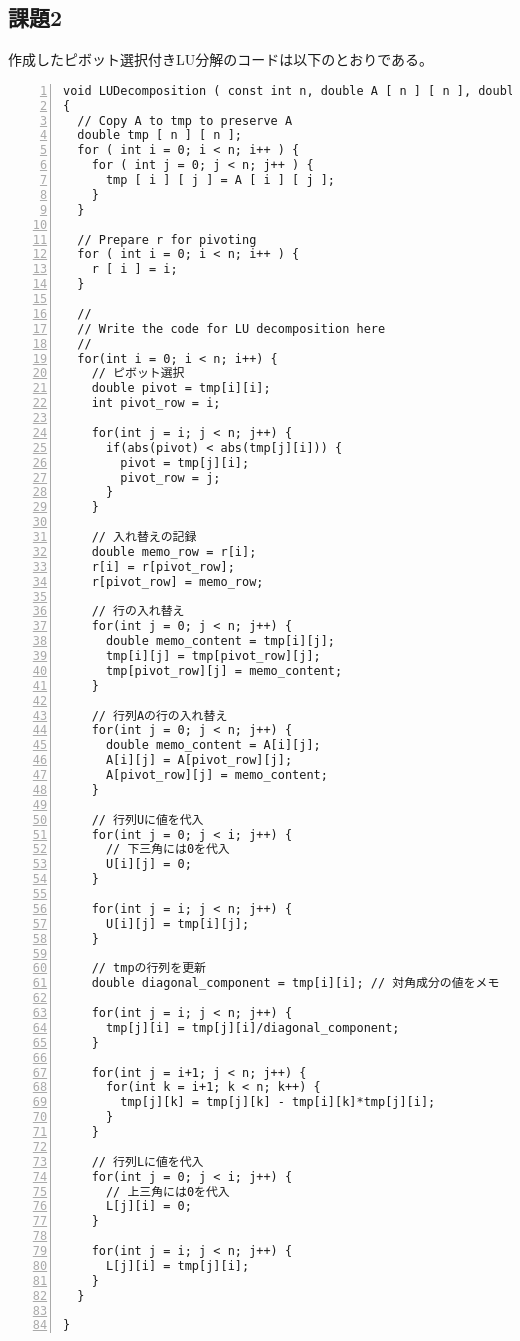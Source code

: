 \documentclass[a4paper]{jsarticle}
\begin{document}
\subsection*{課題2}

作成したピボット選択付きLU分解のコードは以下のとおりである。

\begin{lstlisting}[caption={\texttt{ピボット選択付きLU分解のプログラム}}, numbers=left, label={pivot_LU}]
  void LUDecomposition ( const int n, double A [ n ] [ n ], double L [ n ] [ n ], double U [ n ] [ n ], double r [ n ] )
{
  // Copy A to tmp to preserve A
  double tmp [ n ] [ n ];
  for ( int i = 0; i < n; i++ ) {
    for ( int j = 0; j < n; j++ ) {
      tmp [ i ] [ j ] = A [ i ] [ j ];
    }
  }

  // Prepare r for pivoting
  for ( int i = 0; i < n; i++ ) {
    r [ i ] = i;
  }

  //
  // Write the code for LU decomposition here
  //
  for(int i = 0; i < n; i++) {
    // ピボット選択
    double pivot = tmp[i][i];
    int pivot_row = i;  

    for(int j = i; j < n; j++) {
      if(abs(pivot) < abs(tmp[j][i])) {
        pivot = tmp[j][i];
        pivot_row = j;
      }
    }

    // 入れ替えの記録
    double memo_row = r[i];
    r[i] = r[pivot_row];
    r[pivot_row] = memo_row;

    // 行の入れ替え
    for(int j = 0; j < n; j++) {
      double memo_content = tmp[i][j];
      tmp[i][j] = tmp[pivot_row][j];
      tmp[pivot_row][j] = memo_content;
    }

    // 行列Aの行の入れ替え
    for(int j = 0; j < n; j++) {
      double memo_content = A[i][j];
      A[i][j] = A[pivot_row][j];
      A[pivot_row][j] = memo_content;
    }

    // 行列Uに値を代入
    for(int j = 0; j < i; j++) {
      // 下三角には0を代入
      U[i][j] = 0;
    }

    for(int j = i; j < n; j++) {
      U[i][j] = tmp[i][j];
    }

    // tmpの行列を更新
    double diagonal_component = tmp[i][i]; // 対角成分の値をメモ

    for(int j = i; j < n; j++) {
      tmp[j][i] = tmp[j][i]/diagonal_component;
    }

    for(int j = i+1; j < n; j++) {
      for(int k = i+1; k < n; k++) {
        tmp[j][k] = tmp[j][k] - tmp[i][k]*tmp[j][i];
      }
    }

    // 行列Lに値を代入
    for(int j = 0; j < i; j++) {
      // 上三角には0を代入
      L[j][i] = 0;
    }

    for(int j = i; j < n; j++) {
      L[j][i] = tmp[j][i];
    }
  }

}
\end{lstlisting}
\end{document}
